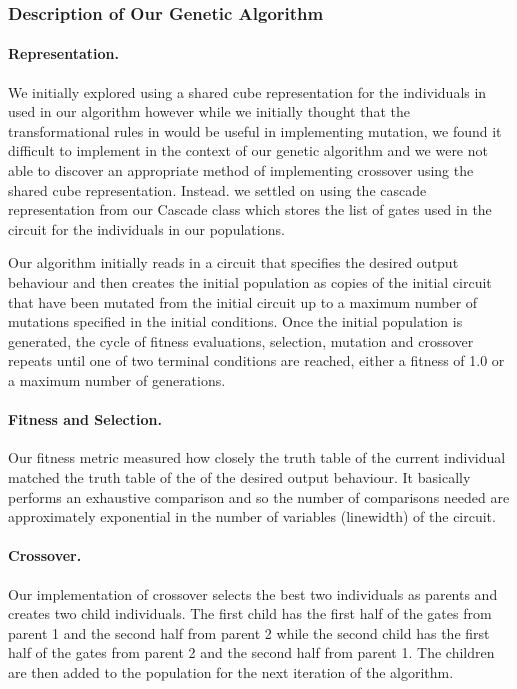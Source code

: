   \subsubsection{Description of Our Genetic Algorithm}

\paragraph{Representation.} 

We initially explored using a shared cube representation for the individuals in used in our algorithm however while we initially 
thought that the transformational rules  in \cite{Thornton2007} would be useful in implementing mutation, we found it difficult to implement 
in the context of our genetic algorithm and we were not able to discover an appropriate method of implementing crossover using the shared 
cube representation. Instead. we settled on using the cascade representation from our Cascade class which stores the list of gates used 
in the circuit for the individuals in our populations.

Our algorithm initially reads in a circuit that specifies the desired output behaviour and then creates the initial population as copies 
of the initial circuit that have been mutated from the initial circuit up to a maximum number of mutations specified in the initial 
conditions. Once the initial population is generated, the cycle of fitness evaluations, selection, mutation and crossover repeats until 
one of two terminal conditions are reached, either a fitness of 1.0 or a maximum number of generations.

\paragraph{Fitness and Selection.} 

Our fitness metric measured how closely the truth table of the current individual matched the truth table of the of 
the desired output behaviour. It basically performs an exhaustive comparison and so the number of comparisons needed are approximately
 exponential in the number of variables (linewidth) of the circuit.  


\paragraph{Crossover.}

Our implementation of crossover selects the best two individuals as parents and creates two child individuals. The first child has the 
first half of the gates from parent 1 and the second half from parent 2 while the second child has the first half of the gates from 
parent 2 and the second half from parent 1. The children are then added to the population for the next iteration of the algorithm. 

